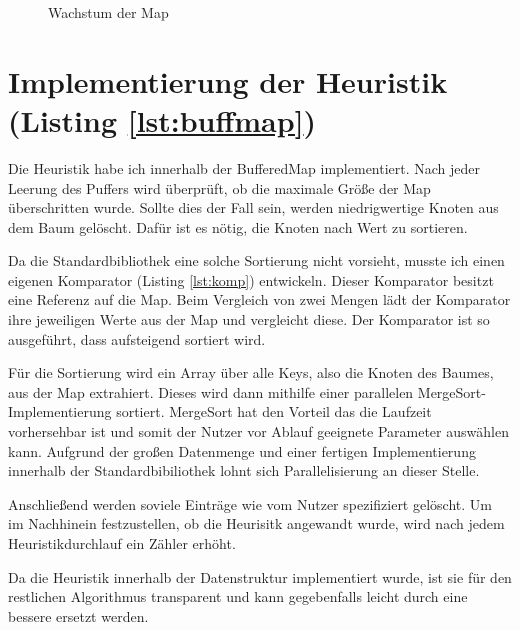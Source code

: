 \begin{figure}[!h]
	\centering
	
	\caption{Wachstum der Map}
	\label{abb:map}
\end{figure}

\section{Implementierung der Heuristik (Listing \ref{lst:buffmap})}
Die Heuristik habe ich innerhalb der BufferedMap implementiert. Nach jeder Leerung des Puffers wird überprüft, ob die maximale Größe der Map überschritten wurde.
Sollte dies der Fall sein, werden niedrigwertige Knoten aus dem Baum gelöscht. Dafür ist es nötig, die Knoten nach Wert zu sortieren.

Da die Standardbibliothek eine solche Sortierung nicht vorsieht, musste ich einen eigenen Komparator (Listing \ref{lst:komp}) entwickeln. Dieser Komparator besitzt eine Referenz auf die Map. Beim Vergleich von zwei Mengen lädt der Komparator ihre jeweiligen Werte aus der Map und vergleicht diese. Der Komparator ist so ausgeführt, dass aufsteigend sortiert wird.

Für die Sortierung wird ein Array über alle Keys, also die Knoten des Baumes, aus der Map extrahiert. Dieses wird dann mithilfe einer parallelen MergeSort-Implementierung sortiert. MergeSort hat den Vorteil das die Laufzeit vorhersehbar ist und somit der Nutzer vor Ablauf geeignete Parameter auswählen kann. Aufgrund der großen Datenmenge und einer fertigen Implementierung innerhalb der Standardbibiliothek lohnt sich Parallelisierung an dieser Stelle.

Anschließend werden soviele Einträge wie vom Nutzer spezifiziert gelöscht. Um im Nachhinein festzustellen, ob die Heurisitk angewandt wurde, wird nach jedem Heuristikdurchlauf ein Zähler erhöht.

Da die Heuristik innerhalb der Datenstruktur implementiert wurde, ist sie für den restlichen Algorithmus transparent und kann gegebenfalls leicht durch eine bessere ersetzt werden.